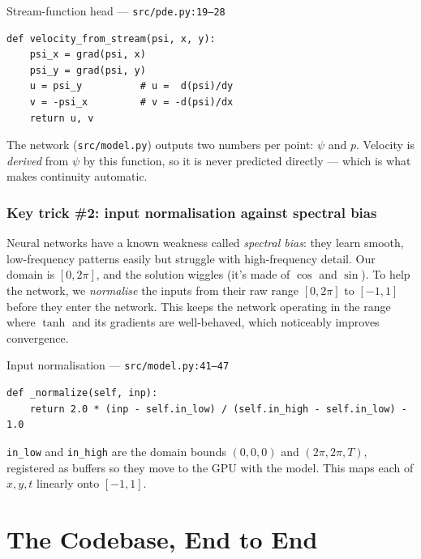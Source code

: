 \documentclass[11pt,a4paper]{article}
\begin{document}
\begin{coderef}{Stream-function head --- \texttt{src/pde.py:19--28}}
\begin{lstlisting}[style=pycode]
def velocity_from_stream(psi, x, y):
    psi_x = grad(psi, x)
    psi_y = grad(psi, y)
    u = psi_y          # u =  d(psi)/dy
    v = -psi_x         # v = -d(psi)/dx
    return u, v
\end{lstlisting}
The network (\texttt{src/model.py}) outputs two numbers per point: $\psi$ and
$p$. Velocity is \emph{derived} from $\psi$ by this function, so it is never
predicted directly --- which is what makes continuity automatic.
\end{coderef}

\section{Key trick \#2: input normalisation against spectral bias}
\label{sec:normalization}

Neural networks have a known weakness called \emph{spectral bias}: they learn
smooth, low-frequency patterns easily but struggle with high-frequency detail.
Our domain is $[0, 2\pi]$, and the solution wiggles (it's made of $\cos$ and
$\sin$). To help the network, we \emph{normalise} the inputs from their raw
range $[0, 2\pi]$ to $[-1, 1]$ before they enter the network. This keeps the
network operating in the range where $\tanh$ and its gradients are well-behaved,
which noticeably improves convergence.

\begin{coderef}{Input normalisation --- \texttt{src/model.py:41--47}}
\begin{lstlisting}[style=pycode]
def _normalize(self, inp):
    return 2.0 * (inp - self.in_low) / (self.in_high - self.in_low) - 1.0
\end{lstlisting}
\texttt{in\_low} and \texttt{in\_high} are the domain bounds
$(0,0,0)$ and $(2\pi, 2\pi, T)$, registered as buffers so they move to the GPU
with the model. This maps each of $x,y,t$ linearly onto $[-1,1]$.
\end{coderef}

\part{The Codebase, End to End}
\label{part:codebase}
\end{document}
